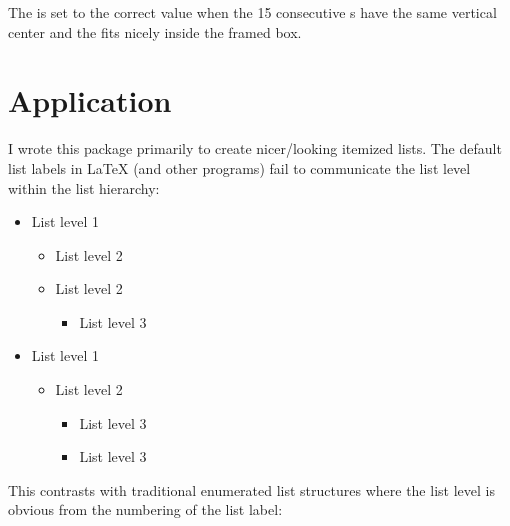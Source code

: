 \documentclass{beery}
\begin{document}
The \textbulletfactor{} is set to the correct value when the 15 consecutive s have the same vertical center and the  fits nicely inside the framed box.


\section{Application}
\label{sec:application}

I wrote this package primarily to create nicer\-/looking itemized lists.
The default list labels in \LaTeX{} (and other programs) fail to communicate the list level within the list hierarchy:

\begin{multicols}{2}
  \begin{itemize}[label=\textbullet]
    \item List level 1
    \begin{itemize}[label=\textbf{--}]
      \item List level 2
      \item List level 2
      \begin{itemize}[label=\textasteriskcentered]
        \item List level 3
      \end{itemize}
    \end{itemize}
    \item List level 1
    \begin{itemize}[label=\textbf{--}]
      \item List level 2
      \begin{itemize}[label=\textasteriskcentered]
        \item List level 3
        \item List level 3
      \end{itemize}
    \end{itemize}
  \end{itemize}
\end{multicols}

This contrasts with traditional enumerated list structures where the list level is obvious from the numbering of the list label:
\end{document}
